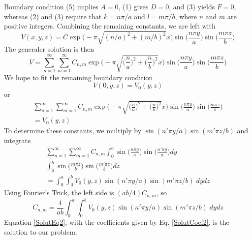 \documentclass[../../../main.tex]{subfiles}
\begin{document}
Boundary condition (5) implies $A = 0$, (1) gives $D = 0$, and (3) yields $F = 0$, whereas (2) and (3) require that $k = n\pi/a$ and $l = m\pi/b$, where $n$ and $m$ are positive integers. Combining the remaining constants, we are left with
\begin{equation*}
    V(x,y,z)=C\exp\biggl(-\pi\sqrt{(n/a)^2+(m/b)^2} x\biggr) \sin\biggl(\frac{n\pi y}{a}\biggr) \sin\biggl(\frac{m\pi z}{b}\biggr)
\end{equation*}
The generaler solution is then
\begin{equation}\label{SolutEq2}
    V=\sum_{n=1}^{\infty}\sum_{m=1}^{\infty}C_{n,m}\exp\biggl(-\pi\sqrt{\big(\frac{n}{a}\big)^2+\big(\frac{n}{b}\big)^2} x\biggr) \sin\biggl(\frac{n\pi y}{a}\biggr) \sin\biggl(\frac{m\pi z}{b}\biggr)
\end{equation}
We hope to ﬁt the remaining boundary condition
\begin{equation*}
    V(0,y,z)=V_0(y,z)
\end{equation*}
or 
\begin{multline*}
    \sum_{n=1}^{\infty}\sum_{m=1}^{\infty}C_{n,m}\exp\biggl(-\pi\sqrt{\big(\frac{n}{a}\big)^2+\big(\frac{n}{b}\big)^2}x\biggr) \sin\biggl(\frac{n\pi y}{a}\biggr) \sin\biggl(\frac{m\pi z}{b}\biggr)\\=V_0(y,z)
\end{multline*}
To determine these constants, we multiply by $\sin(n'\pi y/a) \sin(m'\pi z/b)$ and integrate
\begin{multline*}
    \sum_{n=1}^{\infty}\sum_{m=1}^{\infty}C_{n,m} \int_{0}^{a}\sin\biggl(\frac{n\pi y}{a}\biggr) \sin\biggl(\frac{n'\pi y}{a}\biggr) dy \\\int_{0}^{b} \sin\biggl(\frac{m\pi z}{b}\biggr)\sin\biggl(\frac{m'\pi z}{b}\biggr)dz\\
    =\int_{0}^{a}\int_{0}^{b}V_0(y,z)\sin(n'\pi y/a) \sin(m'\pi z/b)\;dydz
\end{multline*}
Using Fourier's Trick, the left side is $(ab/4)C_{n,m} $, so
\begin{equation}\label{SolutCoef2}
    C_{n,m}=\frac{4}{ab}\int_{0}^{a}\int_{0}^{b}V_0(y,z)\sin(n'\pi y/a) \sin(m'\pi z/b)\;dydz
\end{equation}
Equation \ref{SolutEq2}, with the coefficients given by Eq. \ref{SolutCoef2}, is the solution to our problem.
\end{document}
